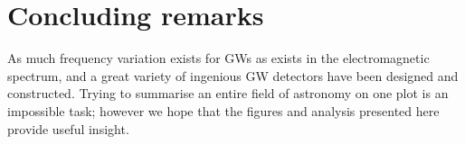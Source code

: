 \section{Concluding remarks}\label{sec:discussion}
As much frequency variation exists for GWs as exists in the electromagnetic spectrum, and a great variety of ingenious GW detectors have been designed and constructed. Trying to summarise an entire field of astronomy on one plot is an impossible task; however we hope that the figures and analysis presented here provide useful insight.
